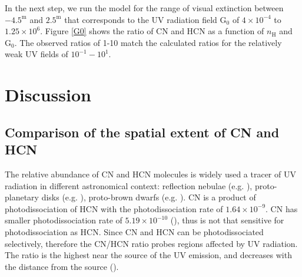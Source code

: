 \documentclass{aa}
\begin{document}
In the next step, we run the model for the
range of visual extinction between $-4.5^{\mathrm{m}}$ and $2.5^{\mathrm{m}}$ that corresponds to
the UV radiation field G$_0$ of $4\times 10^{-4}$ to $1.25\times 10^{6}$. Figure \ref{G0} 
shows the ratio of CN and HCN as a function of $n_\mathrm{H}$ and G$_0$. The observed ratios 
of 1-10 match the calculated ratios for the relatively weak UV fields of $10^{-1}-10^1$. 

%
\section{Discussion}
\subsection{Comparison of the spatial extent of CN and HCN}
The relative abundance of CN and HCN molecules is widely used a tracer of UV radiation in different
astronomical context: reflection nebulae (e.g. \citealt{Fue95}), proto-planetary disks (e.g.
\citealt{Cha12}), proto-brown dwarfs (e.g. \citealt{Ria18}). CN is a product of photodissociation of
HCN with the photodissociation rate of $1.64\times10^{-9}$. CN has smaller photodissociation rate of
$5.19\times10^{-10}$ (\citealt{Hea17}), thus is not that sensitive for photodissociation as HCN.
Since CN and HCN can be photodissociated selectively, therefore the CN/HCN ratio probes regions
affected by UV radiation. The ratio is the highest near the source of the UV emission, and decreases
with the distance from the source (\citealt{Fue93}). 
\end{document}
